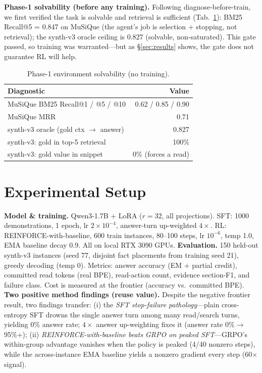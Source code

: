\documentclass[10pt,twocolumn]{article}
\begin{document}
\textbf{Phase-1 solvability (before any training).} Following diagnose-before-train, we first verified the task is solvable and retrieval is sufficient (Tab.~\ref{tab:phase1}): BM25 Recall@5 = 0.847 on MuSiQue (the agent's job is selection + stopping, not retrieval); the synth-v3 oracle ceiling is 0.827 (solvable, non-saturated). This gate passed, so training was warranted---but as \S\ref{sec:results} shows, the gate does not guarantee RL will help.

\begin{table}[t]
\centering\small
\caption{Phase-1 environment solvability (no training).}
\label{tab:phase1}
\begin{tabular}{lr}
\toprule
Diagnostic & Value \\
\midrule
MuSiQue BM25 Recall@1 / @5 / @10 & 0.62 / 0.85 / 0.90 \\
MuSiQue MRR & 0.71 \\
synth-v3 oracle (gold ctx $\to$ answer) & 0.827 \\
synth-v3: gold in top-5 retrieval & 100\% \\
synth-v3: gold value in snippet & 0\% (forces a read) \\
\bottomrule
\end{tabular}
\end{table}

\section{Experimental Setup}
\label{sec:setup}
\textbf{Model \& training.} Qwen3-1.7B + LoRA ($r{=}32$, all projections). SFT: 1000 demonstrations, 1 epoch, lr $2{\times}10^{-4}$, answer-turn up-weighted $4\times$. RL: REINFORCE-with-baseline, 600 train instances, 80--100 steps, lr $10^{-6}$, temp 1.0, EMA baseline decay 0.9. All on local RTX 3090 GPUs.
\textbf{Evaluation.} 150 held-out synth-v3 instances (seed 77, disjoint fact placements from training seed 21), greedy decoding (temp 0). Metrics: answer accuracy (EM + partial credit), committed read tokens (real BPE), read-action count, evidence section-F1, and failure class. Cost is measured at the frontier (accuracy vs.\ committed BPE).
\textbf{Two positive method findings (reuse value).} Despite the negative frontier result, two findings transfer: (i) the \emph{SFT stop-failure pathology}---plain cross-entropy SFT drowns the single answer turn among many read/search turns, yielding 0\% answer rate; $4\times$ answer up-weighting fixes it (answer rate 0\%$\to$95\%+); (ii) \emph{REINFORCE-with-baseline beats GRPO on peaked SFT}---GRPO's within-group advantage vanishes when the policy is peaked (4/40 nonzero steps), while the across-instance EMA baseline yields a nonzero gradient every step (60$\times$ signal).
\end{document}
